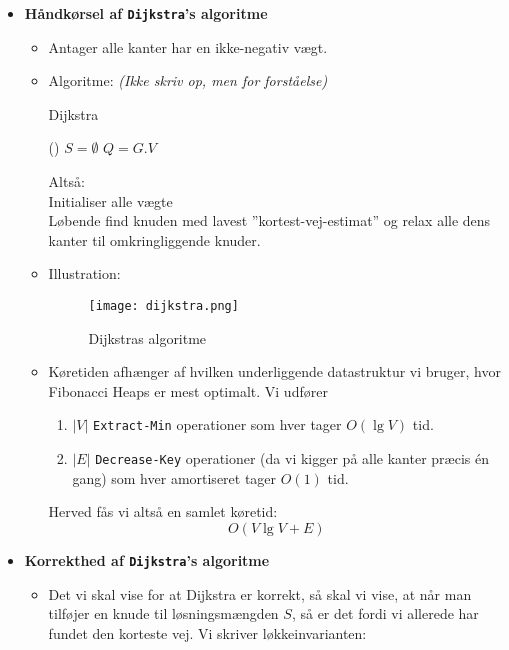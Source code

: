 \begin{itemize}
\item \textbf{Håndkørsel af \texttt{Dijkstra}'s algoritme}
\begin{itemize}
	\item Antager alle kanter har en ikke-negativ vægt.
	\item Algoritme: \textit{(Ikke skriv op, men for forståelse)}\\
	\begin{algorithm}[H] \caption{Dijkstra} \label{alg:dijkstra}
		\Fn(){}{
			\;
			$S = \emptyset$\;
			$Q = G.V$\;
		}
	\end{algorithm}\vspace{1em}
	
	Altså:\\
	Initialiser alle vægte\\
	Løbende find knuden med lavest ''kortest-vej-estimat'' og relax alle dens kanter til omkringliggende knuder.
	\item Illustration:
	\begin{figure}[H]
		\begin{center}
			\texttt{[image: dijkstra.png]}
		\end{center}
		\caption{Dijkstras algoritme}
		\label{fig:dijkstra}
	\end{figure}
	
	
	\item Køretiden afhænger af hvilken underliggende datastruktur vi bruger, hvor Fibonacci Heaps er mest optimalt. Vi udfører
	\begin{enumerate}
		\item $|V|$ \texttt{Extract-Min} operationer som hver tager $O(\lg V)$ tid.
		\item $|E|$ \texttt{Decrease-Key} operationer (da vi kigger på alle kanter præcis én gang) som hver amortiseret tager $O(1)$ tid.
	\end{enumerate}
	
	Herved fås vi altså en samlet køretid:
	$$
	O(V \lg V + E)
	$$
\end{itemize}

\newpage
\item \textbf{Korrekthed af \texttt{Dijkstra}'s algoritme}
\begin{itemize}
	\item Det vi skal vise for at Dijkstra er korrekt, så skal vi vise, at når man tilføjer en knude til løsningsmængden $S$, så er det fordi vi allerede har fundet den korteste vej. Vi skriver løkkeinvarianten:\\
	

\end{itemize}
\end{itemize}
